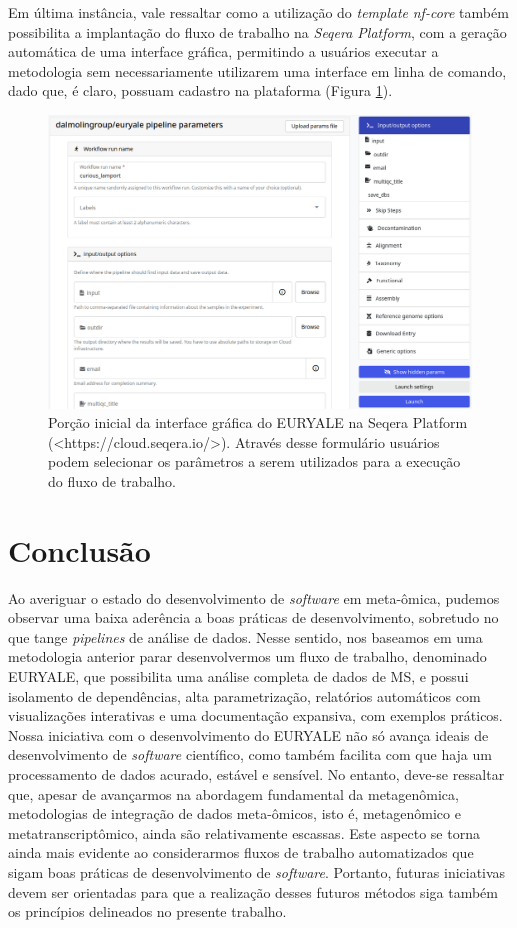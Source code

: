 \documentclass[
	12pt,				%
	oneside,			%
	a4paper,			%
	chapter=TITLE,		%
	section=TITLE,		%
	english,			%
	brazil				%
	]{abntex2}
\begin{document}
Em última instância, vale ressaltar como a utilização do \emph{template} \emph{nf-core} também possibilita a implantação do fluxo de trabalho na \emph{Seqera Platform}, com a geração automática de uma interface gráfica, permitindo a usuários executar a metodologia sem necessariamente utilizarem uma interface em linha de comando, dado que, é claro, possuam cadastro na plataforma (Figura \ref{fig:seqeraplat}).
\begin{figure}[H]

{\centering \includegraphics[width=0.7\linewidth]{figure/seqera_platform_example} 

}

\caption{Porção inicial da interface gráfica do EURYALE na Seqera Platform (<https://cloud.seqera.io/>). Através desse formulário usuários podem selecionar os parâmetros a serem utilizados para a execução do fluxo de trabalho.}\label{fig:seqeraplat}
\end{figure}
\chapter{Conclusão}\label{conclusuxe3o}

Ao averiguar o estado do desenvolvimento de \emph{software} em meta-ômica, pudemos observar
uma baixa aderência a boas práticas de desenvolvimento, sobretudo no que tange \emph{pipelines}
de análise de dados. Nesse sentido, nos baseamos em uma metodologia anterior parar desenvolvermos um fluxo de trabalho, denominado EURYALE,
que possibilita uma análise completa de dados de \gls{MS}, e possui isolamento de dependências, alta parametrização, relatórios automáticos com visualizações interativas e uma documentação expansiva, com exemplos práticos.
Nossa iniciativa com o desenvolvimento do EURYALE não só avança ideais de desenvolvimento de \emph{software} científico, como também facilita com que haja um processamento de dados acurado, estável e sensível.
No entanto, deve-se ressaltar que, apesar de avançarmos na abordagem fundamental da metagenômica, metodologias de integração de dados
meta-ômicos, isto é, metagenômico e metatranscriptômico, ainda são relativamente escassas. Este aspecto se torna ainda mais evidente ao considerarmos fluxos de trabalho automatizados que sigam boas práticas de desenvolvimento de \emph{software}.
Portanto, futuras iniciativas devem ser orientadas para que a realização desses futuros métodos siga também os princípios delineados no presente trabalho.
\end{document}
